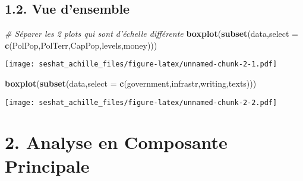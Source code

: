 \documentclass[
]{article}
\newenvironment{Shaded}{\begin{snugshade}}{\end{snugshade}}
\newcommand{\CommentTok}[1]{\textcolor[rgb]{0.56,0.35,0.01}{\textit{#1}}}
\newcommand{\DataTypeTok}[1]{\textcolor[rgb]{0.13,0.29,0.53}{#1}}
\newcommand{\KeywordTok}[1]{\textcolor[rgb]{0.13,0.29,0.53}{\textbf{#1}}}
\newcommand{\NormalTok}[1]{#1}
\newcommand{\OperatorTok}[1]{\textcolor[rgb]{0.81,0.36,0.00}{\textbf{#1}}}
\newcommand{\StringTok}[1]{\textcolor[rgb]{0.31,0.60,0.02}{#1}}
\begin{document}
\hypertarget{vue-densemble}{%
\subsection{1.2. Vue d'ensemble}\label{vue-densemble}}

\begin{Shaded}
\begin{Highlighting}[]
\CommentTok{# Séparer les 2 plots qui sont d'échelle différente}
\KeywordTok{boxplot}\NormalTok{(}\KeywordTok{subset}\NormalTok{(data,}\DataTypeTok{select =} \KeywordTok{c}\NormalTok{(PolPop,PolTerr,CapPop,levels,money)))}
\end{Highlighting}
\end{Shaded}

\texttt{[image: seshat\_achille\_files/figure-latex/unnamed-chunk-2-1.pdf]}

\begin{Shaded}
\begin{Highlighting}[]
\KeywordTok{boxplot}\NormalTok{(}\KeywordTok{subset}\NormalTok{(data,}\DataTypeTok{select =} \KeywordTok{c}\NormalTok{(government,infrastr,writing,texts)))}
\end{Highlighting}
\end{Shaded}

\texttt{[image: seshat\_achille\_files/figure-latex/unnamed-chunk-2-2.pdf]}

\hypertarget{analyse-en-composante-principale}{%
\section{2. Analyse en Composante
Principale}\label{analyse-en-composante-principale}}

\begin{Shaded}
\end{Shaded}
\end{document}

